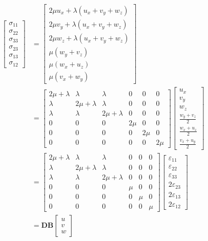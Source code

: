 \documentclass[12pt,a4paper]{article}
\begin{document}
\begin{align*}
\begin{bmatrix}
\sigma_{11} \\ \sigma_{22} \\ \sigma_{33} \\ \sigma_{23} \\ \sigma_{13} \\ \sigma_{12}
\end{bmatrix} & = \begin{bmatrix}
2\mu u_x + \lambda (u_x + v_y + w_z)\\
2\mu v_y + \lambda (u_x + v_y + w_z)\\
2\mu w_z + \lambda (u_x + v_y + w_z)\\
\mu (w_y + v_z) \\
\mu (w_x + u_z) \\
\mu (v_x + w_y)
\end{bmatrix} \\
& = \begin{bmatrix}
2\mu+\lambda & \lambda & \lambda & 0 & 0 & 0\\
\lambda & 2\mu+\lambda  & \lambda & 0 & 0 & 0\\
\lambda &  \lambda & 2\mu+\lambda & 0 & 0 & 0 \\
0 & 0 & 0 & 2\mu & 0 & 0 \\
0 & 0 & 0 & 0 & 2\mu & 0 \\
0 & 0 & 0 & 0 & 0 & 2\mu
\end{bmatrix}
\begin{bmatrix}
u_x \\ v_y \\ w_z \\ \frac{w_y + v_z}{2} \\ \frac{w_x + u_z}{2} \\ \frac{v_x + u_y}{2}
\end{bmatrix} \\
& = \begin{bmatrix}
2\mu+\lambda & \lambda & \lambda & 0 & 0 & 0\\
\lambda & 2\mu+\lambda  & \lambda & 0 & 0 & 0\\
\lambda &  \lambda & 2\mu+\lambda & 0 & 0 & 0 \\
0 & 0 & 0 & \mu & 0 & 0 \\
0 & 0 & 0 & 0 & \mu & 0 \\
0 & 0 & 0 & 0 & 0 & \mu
\end{bmatrix}
\begin{bmatrix}
\varepsilon_{11} \\ \varepsilon_{22} \\ \varepsilon_{33} \\ 2\varepsilon_{23} \\ 2\varepsilon_{13} \\ 2\varepsilon_{12}
\end{bmatrix} \\
& = \textbf{DB}\begin{bmatrix}
u \\ v \\ w
\end{bmatrix}
\end{align*}
\end{document}
